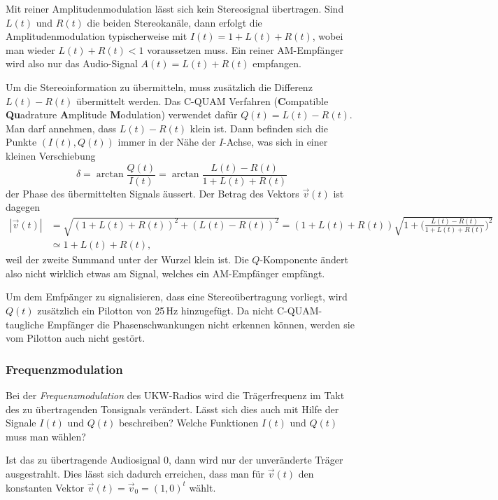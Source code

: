 Mit reiner Amplitudenmodulation lässt sich kein Stereosignal übertragen.
Sind $L(t)$ und $R(t)$ die beiden Stereokanäle, dann erfolgt die
Amplitudenmodulation typischerweise mit $I(t)=1+L(t)+R(t)$,
wobei man wieder $L(t)+R(t)<1$ voraussetzen muss.
Ein reiner AM-Empfänger wird also nur das Audio-Signal $A(t)=L(t) + R(t)$
empfangen.

Um die Stereoinformation zu übermitteln, muss zusätzlich die Differenz
$L(t)-R(t)$ übermittelt werden.
Das C-QUAM Verfahren ({\bf C}ompatible {\bf Qu}adrature {\bf A}mplitude
{\bf M}odulation) verwendet dafür $Q(t)=L(t)-R(t)$.
Man darf annehmen, dass $L(t)-R(t)$ klein ist.
Dann befinden sich die Punkte $(I(t),Q(t))$ immer in der
Nähe der $I$-Achse, was sich in einer kleinen Verschiebung
\[
\delta = \arctan\frac{Q(t)}{I(t)} = \arctan\frac{L(t)-R(t)}{1+L(t)+R(t)}
\]
der Phase des übermittelten Signals äussert.
Der Betrag des Vektors $\vec{v}(t)$ ist dagegen
\begin{align*}
|\vec{v}(t)|
&=
\sqrt{
(1+L(t)+R(t))^2
+
(L(t)-R(t))^2
}
=
(1+L(t)+R(t))
\sqrt{
1+
\biggl(
\frac{L(t)-R(t)}{1+L(t)+R(t)}\biggr)^2
}
\\
&\simeq 1+L(t)+R(t),
\end{align*}
weil der zweite Summand unter der Wurzel klein ist.
Die $Q$-Komponente ändert also nicht wirklich etwas am Signal, welches
ein AM-Empfänger empfängt.

Um dem Emfpänger zu signalisieren, dass eine Stereoübertragung
vorliegt, wird $Q(t)$ zusätzlich ein Pilotton von 25\,Hz hinzugefügt.
Da nicht C-QUAM-taugliche Empfänger die Phasenschwankungen nicht erkennen
können, werden sie vom Pilotton auch nicht gestört.

\subsubsection{Frequenzmodulation}
Bei der {\em Frequenzmodulation} des UKW-Radios wird die Trägerfrequenz
im Takt des zu übertragenden Tonsignals verändert.
Lässt sich dies auch mit Hilfe der Signale $I(t)$ und $Q(t)$
beschreiben?
Welche Funktionen $I(t)$ und $Q(t)$ muss man wählen?

Ist das zu übertragende Audiosignal $0$, dann wird nur der unveränderte
Träger ausgestrahlt.
Dies lässt sich dadurch erreichen, dass man für $\vec{v}(t)$ den
konstanten Vektor $\vec{v}(t)=\vec{v}_0=(1,0)^t$ wählt.

